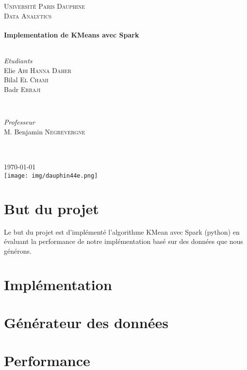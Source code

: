 \documentclass[french]{article}
\begin{document}
\begin{titlepage}
\SetDate[29/04/2018]
\newcommand{\HRule}{\rule{\linewidth}{0.5mm}}
\center 
\textsc{\LARGE Université Paris Dauphine}\\[1.5cm] 
\textsc{\Large Data Analytics}\\[0.5cm]
\HRule \\[0.4cm] { \huge \bfseries
Implementation de KMeans avec Spark}\\[0.4cm] \HRule \\[1.5cm]
\begin{minipage}{0.4\textwidth}
	\begin{flushleft} \large
		\emph{Etudiants}
		\\ Elie \textsc{Abi Hanna Daher}
		\\ Bilal \textsc{El Chami}
		\\ Badr \textsc{Erraji}
	\end{flushleft}
\end{minipage}
~
\begin{minipage}{0.4\textwidth}
	\begin{flushright} \large
		\emph{Professeur} 
		\\ M. Benjamin \textsc{Negrevergne}
		\\  \hspace{1cm}
		\\  \hspace{1cm}
	\end{flushright}
\end{minipage}\\[2cm]
{\large \today}\\[2cm]
\texttt{[image: img/dauphin44e.png]}
\vfill
\end{titlepage}
 
\tableofcontents 
\newpage

\section{But du projet}
Le but du projet est d'implémenté l'algorithme KMean avec Spark (python) en évaluant la performance de notre implémentation basé sur des données que nous générons.

\section{Implémentation}

\section{Générateur des données}

\section{Performance}
\end{document}
